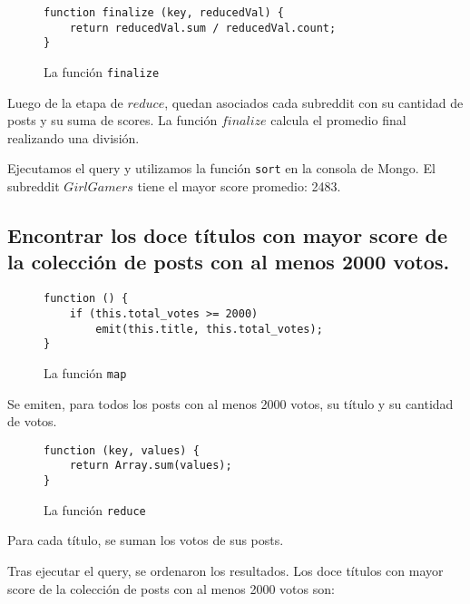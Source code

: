 \documentclass[11pt, a4paper, twoside]{article}
\begin{document}
\begin{figure}[H]
\caption{La función \texttt{finalize}}
\centering
\begin{verbatim}
function finalize (key, reducedVal) {
    return reducedVal.sum / reducedVal.count;
}
\end{verbatim}
\end{figure}

Luego de la etapa de $reduce$, quedan asociados cada subreddit con su cantidad de posts y su suma de scores. La función $finalize$ calcula el promedio final realizando una división.

Ejecutamos el query y utilizamos la función \texttt{sort} en la consola de Mongo. El subreddit $GirlGamers$ tiene el mayor score promedio: 2483.

\newpage
\subsection{Encontrar los doce títulos con mayor score de la colección de posts con al menos 2000 votos.}

\begin{figure}[H]
\caption{La función \texttt{map}}
\centering
\begin{verbatim}
function () {
    if (this.total_votes >= 2000)
        emit(this.title, this.total_votes);
}
\end{verbatim}
\end{figure}

Se emiten, para todos los posts con al menos 2000 votos, su título y su cantidad de votos.

\begin{figure}[H]
\caption{La función \texttt{reduce}}
\centering
\begin{verbatim}
function (key, values) {
    return Array.sum(values);
}
\end{verbatim}
\end{figure}

Para cada título, se suman los votos de sus posts.

Tras ejecutar el query, se ordenaron los resultados. Los doce títulos con mayor score de la colección de posts con al menos 2000 votos son:
\end{document}
